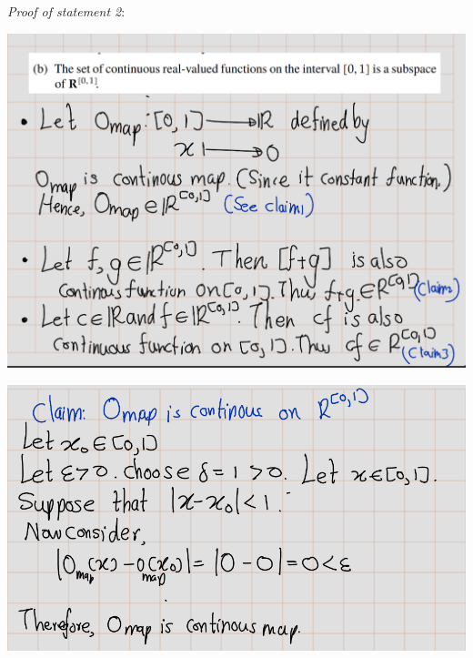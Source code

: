 \documentclass[
]{book}
\theoremstyle{definition}
\theoremstyle{definition}
\theoremstyle{definition}
\theoremstyle{definition}
\theoremstyle{remark}
\begin{document}
\emph{Proof of statement 2}:

\includegraphics{fig/Ex1C/Ex2-1.png}

\includegraphics{fig/Ex1C/Ex2-2.png}
\end{document}
